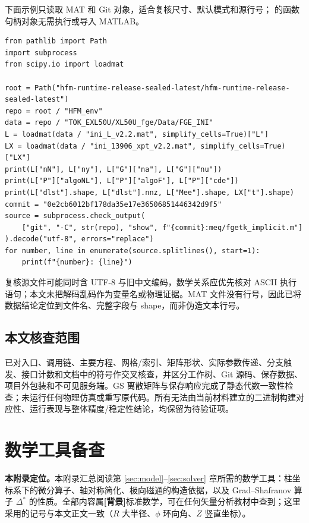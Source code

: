 \documentclass[12pt,fontset=none]{ctexart}
\numberwithin{equation}{section}
\numberwithin{table}{section}
\numberwithin{figure}{section}
\newcommand{\code}[1]{\texttt{\expandafter\seqsplit\expandafter{\detokenize{#1}}}}
\newcommand{\evbg}{\textbf{[背景]}}
\begin{document}
下面示例只读取 MAT 和 Git 对象，适合复核尺寸、默认模式和源行号；\code{scipy.io} 的函数句柄对象无需执行或导入 MATLAB。
\begin{lstlisting}[style=pseudo, caption={只读核对示例}, label=lst:readonly]
from pathlib import Path
import subprocess
from scipy.io import loadmat

root = Path("hfm-runtime-release-sealed-latest/hfm-runtime-release-sealed-latest")
repo = root / "HFM_env"
data = repo / "TOK_EXL50U/XL50U_fge/Data/FGE_INI"
L = loadmat(data / "ini_L_v2.2.mat", simplify_cells=True)["L"]
LX = loadmat(data / "ini_13906_xpt_v2.2.mat", simplify_cells=True)["LX"]
print(L["nN"], L["ny"], L["G"]["na"], L["G"]["nu"])
print(L["P"]["algoNL"], L["P"]["algoF"], L["P"]["cde"])
print(L["dlst"].shape, L["dlst"].nnz, L["Mee"].shape, LX["t"].shape)
commit = "0e2cb6012bf178da35e17e36506851446342d9f5"
source = subprocess.check_output(
    ["git", "-C", str(repo), "show", f"{commit}:meq/fgetk_implicit.m"]
).decode("utf-8", errors="replace")
for number, line in enumerate(source.splitlines(), start=1):
    print(f"{number}: {line}")
\end{lstlisting}

复核源文件可能同时含 UTF-8 与旧中文编码，数学关系应优先核对 ASCII 执行语句；本文未把解码乱码作为变量名或物理证据。MAT 文件没有行号，因此已将数据结论定位到文件名、完整字段与 shape，而非伪造文本行号。

\subsection{本文核查范围}\label{app:scope}

已对入口、调用链、主要方程、网格/索引、矩阵形状、实际参数传递、分支触发、接口计数和文档中的符号作交叉核查，并区分工作树、Git 源码、保存数据、项目外包装和不可见服务端。GS 离散矩阵与保存响应完成了静态代数一致性检查；未运行任何物理仿真或重写原代码。所有无法由当前材料建立的二进制构建对应性、运行表现与整体精度/稳定性结论，均保留为待验证项。

\section{数学工具备查}\label{app:math}

\textbf{本附录定位。}本附录汇总阅读第 \ref{sec:model}--\ref{sec:solver} 章所需的数学工具：柱坐标系下的微分算子、轴对称简化、极向磁通的构造依据，以及 Grad--Shafranov 算子 $\Delta^*$ 的性质。全部内容属\evbg{}标准数学，可在任何矢量分析教材中查到；这里采用的记号与本文正文一致（$R$ 大半径、$\phi$ 环向角、$Z$ 竖直坐标）。
\end{document}

